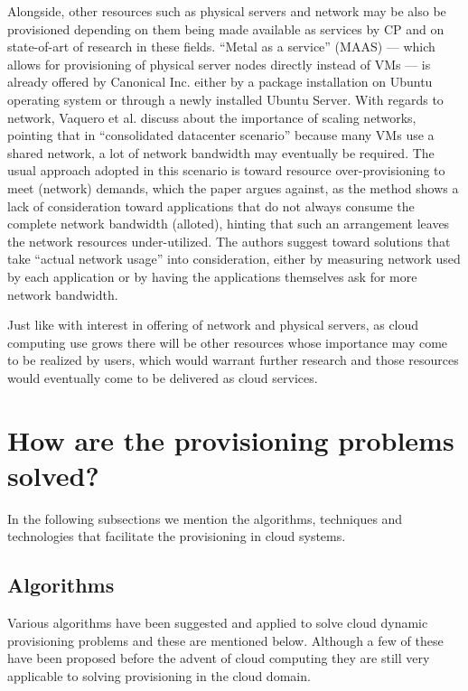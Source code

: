 \documentclass[10pt,journal,cspaper,compsoc]{IEEEtran}
\begin{document}
Alongside, other resources such as physical servers \cite{2013_MAAS_Canonical,2012_MAASEffect} and network \cite{2012_NAAS_Costa,2011_DynamicallyScalingApps} may be also be provisioned depending on them being made available as services by CP and on state-of-art of research in these fields. ``Metal as a service'' (MAAS) \cite{2013_MAAS_Canonical} --- which allows for provisioning of physical server nodes directly instead of VMs --- is already offered by Canonical Inc. either by a package installation on Ubuntu operating system or through a newly installed Ubuntu Server. With regards to network, Vaquero et al. \cite{2011_DynamicallyScalingApps} discuss about the importance of scaling networks, pointing that in ``consolidated datacenter scenario''  \cite[p.~45]{2011_DynamicallyScalingApps} because many VMs use a shared network, a lot of network bandwidth may eventually be required. The usual approach adopted in this scenario is toward resource over-provisioning to meet (network) demands, which the paper argues against, as the method shows a lack of consideration toward applications that do not always consume the complete network bandwidth (alloted), hinting that such an arrangement leaves the network resources under-utilized. The authors suggest toward solutions that take ``actual network usage'' \cite[p.~47]{2011_DynamicallyScalingApps} into consideration, either by measuring network used by each application or by having the applications themselves ask for more network bandwidth. 

Just like with interest in offering of network and physical servers, as cloud computing use grows there will be other resources whose importance may come to be realized by users, which would warrant further research and those resources would eventually come to be delivered as cloud services.

\section{How are the provisioning problems solved?}
\label{sec:ProvAlgorithms}
In the following subsections we mention the algorithms, techniques and technologies that facilitate the provisioning in cloud systems.

\subsection{Algorithms}
\label{subsec:algorithms}
Various algorithms have been suggested and applied to solve cloud dynamic provisioning problems and these are mentioned below. Although a few of these have been proposed before the advent of cloud computing they are still very applicable to solving provisioning in the cloud domain.
\end{document}
